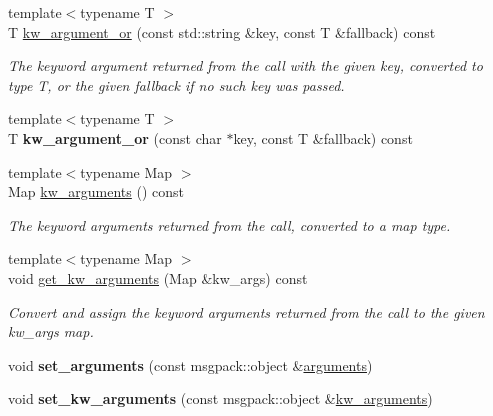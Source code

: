 \begin{DoxyCompactItemize}
\item 
{\footnotesize template$<$typename T $>$ }\\T \hyperlink{classautobahn_1_1wamp__call__result_acd8566b69021382c444edaffdeb7aeb5}{kw\+\_\+argument\+\_\+or} (const std\+::string \&key, const T \&fallback) const 
\begin{DoxyCompactList}\small\item\em The keyword argument returned from the call with the given {\ttfamily key}, converted to type T, or the given {\ttfamily fallback} if no such key was passed. \end{DoxyCompactList}\item 
{\footnotesize template$<$typename T $>$ }\\T {\bfseries kw\+\_\+argument\+\_\+or} (const char $\ast$key, const T \&fallback) const \hypertarget{classautobahn_1_1wamp__call__result_a2edddafcc39be28fd2233d57938e8c34}{}\label{classautobahn_1_1wamp__call__result_a2edddafcc39be28fd2233d57938e8c34}

\item 
{\footnotesize template$<$typename Map $>$ }\\Map \hyperlink{classautobahn_1_1wamp__call__result_a904172ee3b56c2a54d487c0d558b73fe}{kw\+\_\+arguments} () const 
\begin{DoxyCompactList}\small\item\em The keyword arguments returned from the call, converted to a map type. \end{DoxyCompactList}\item 
{\footnotesize template$<$typename Map $>$ }\\void \hyperlink{classautobahn_1_1wamp__call__result_af61e22fc49e755c16ee3bd623506f7ce}{get\+\_\+kw\+\_\+arguments} (Map \&kw\+\_\+args) const 
\begin{DoxyCompactList}\small\item\em Convert and assign the keyword arguments returned from the call to the given {\ttfamily kw\+\_\+args} map. \end{DoxyCompactList}\item 
void {\bfseries set\+\_\+arguments} (const msgpack\+::object \&\hyperlink{classautobahn_1_1wamp__call__result_ae2ea76118fe4ee083b0f482e4b7f6488}{arguments})\hypertarget{classautobahn_1_1wamp__call__result_a3d2836d93ca25948f5aeca6388c2cf54}{}\label{classautobahn_1_1wamp__call__result_a3d2836d93ca25948f5aeca6388c2cf54}

\item 
void {\bfseries set\+\_\+kw\+\_\+arguments} (const msgpack\+::object \&\hyperlink{classautobahn_1_1wamp__call__result_a904172ee3b56c2a54d487c0d558b73fe}{kw\+\_\+arguments})\hypertarget{classautobahn_1_1wamp__call__result_a719bbff5d8dc1e2ac2750d651d60692d}{}\label{classautobahn_1_1wamp__call__result_a719bbff5d8dc1e2ac2750d651d60692d}

\end{DoxyCompactItemize}


